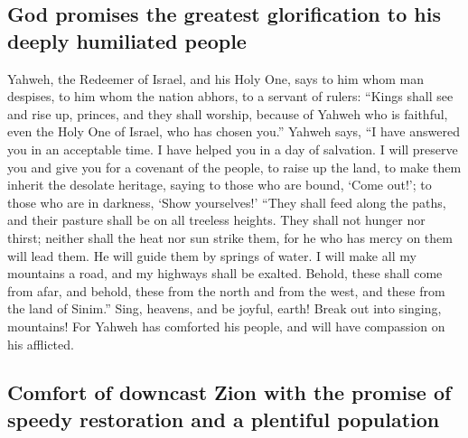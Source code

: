 \hypertarget{god-promises-the-greatest-glorification-to-his-deeply-humiliated-people}{%
\subsection{God promises the greatest glorification to his deeply
humiliated
people}\label{god-promises-the-greatest-glorification-to-his-deeply-humiliated-people}}

 Yahweh, the Redeemer of Israel, and his Holy One, says to
him whom man despises, to him whom the nation abhors, to a servant of
rulers: ``Kings shall see and rise up, princes, and they shall worship,
because of Yahweh who is faithful, even the Holy One of Israel, who has
chosen you.''  Yahweh says, ``I have answered you in an
acceptable time. I have helped you in a day of salvation. I will
preserve you and give you for a covenant of the people, to raise up the
land, to make them inherit the desolate heritage,  saying
to those who are bound, `Come out!'; to those who are in darkness, `Show
yourselves!' ``They shall feed along the paths, and their pasture shall
be on all treeless heights.  They shall not hunger nor
thirst; neither shall the heat nor sun strike them, for he who has mercy
on them will lead them. He will guide them by springs of water.
 I will make all my mountains a road, and my highways
shall be exalted.  Behold, these shall come from afar,
and behold, these from the north and from the west, and these from the
land of Sinim.''  Sing, heavens, and be joyful, earth!
Break out into singing, mountains! For Yahweh has comforted his people,
and will have compassion on his afflicted.

\hypertarget{comfort-of-downcast-zion-with-the-promise-of-speedy-restoration-and-a-plentiful-population}{%
\subsection{Comfort of downcast Zion with the promise of speedy
restoration and a plentiful
population}\label{comfort-of-downcast-zion-with-the-promise-of-speedy-restoration-and-a-plentiful-population}}

